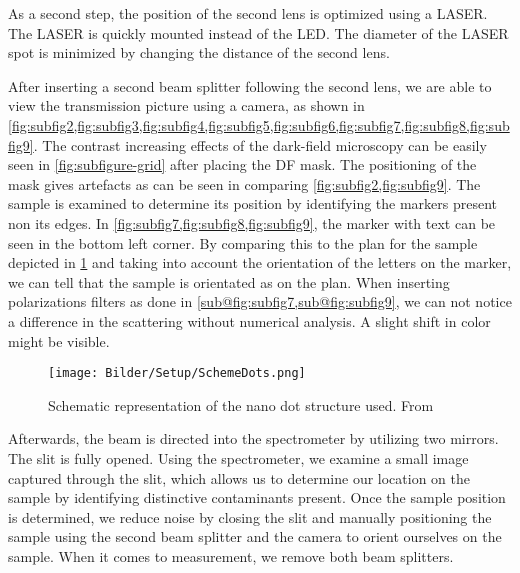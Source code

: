 As a second step, the position of the second lens is optimized using a LASER. The LASER is quickly mounted instead of the LED. The diameter of the LASER spot is minimized by changing the distance of the second lens.

After inserting a second beam splitter following the second lens, we are able to view the transmission picture using a camera, as shown in \cref{fig:subfig2,fig:subfig3,fig:subfig4,fig:subfig5,fig:subfig6,fig:subfig7,fig:subfig8,fig:subfig9}. The contrast increasing effects
of the dark-field microscopy can be easily seen in \cref{fig:subfigure-grid} after placing the DF mask. The positioning of the mask gives artefacts as can be seen in comparing \cref{fig:subfig2,fig:subfig9}. The sample is examined to determine its position by identifying the markers present non its edges. In \cref{fig:subfig7,fig:subfig8,fig:subfig9}, the marker with text can be seen in the bottom left corner. 
By comparing this to the plan for the sample depicted in \cref{fig:NanoDotSketch} and taking into account the orientation of the 
letters on the marker, we can tell that the sample is orientated as on the plan. When inserting polarizations filters as done in \cref{sub@fig:subfig7,sub@fig:subfig9}, we can not notice a difference in the scattering without numerical analysis. A slight shift in color might be visible.  
 

\begin{figure}[ht]
    \centering
    \texttt{[image: Bilder/Setup/SchemeDots.png]}
    \caption{Schematic representation of the nano dot structure used. From \cite{LehrstuhlExperimentalphysikIII.2023}}
    \label{fig:NanoDotSketch}
\end{figure}

Afterwards, the beam is directed into the spectrometer by utilizing two mirrors. The slit is fully opened. Using the spectrometer, we examine a small image captured through the slit, which allows us to determine our location on the sample by identifying distinctive contaminants present. Once the sample position is determined, we reduce noise by closing the slit and manually positioning the sample using the second beam splitter and the camera to orient ourselves on the sample. When it comes to measurement, we remove both beam splitters.